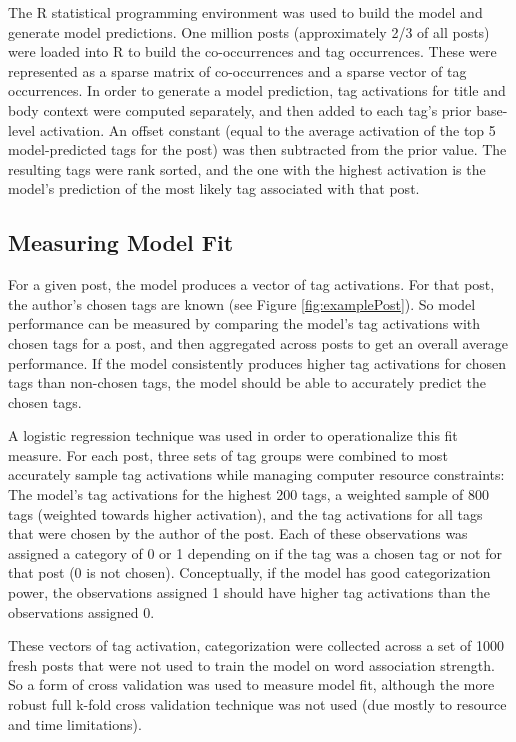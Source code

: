 \documentclass[10pt,letterpaper]{article}
\begin{document}
The R statistical programming environment was used to build the model and generate model predictions.
One million posts (approximately 2/3 of all posts) were loaded into R to build the co-occurrences and tag occurrences.
These were represented as a sparse matrix of co-occurrences and a sparse vector of tag occurrences.
In order to generate a model prediction, tag activations for title and body context were computed separately, and then added to each tag's prior base-level activation.
An offset constant (equal to the average activation of the top 5 model-predicted tags for the post) was then subtracted from the prior value.
The resulting tags were rank sorted, and the one with the highest activation is the model's prediction of the most likely tag associated with that post.

\subsection{Measuring Model Fit}

For a given post, the model produces a vector of tag activations.
For that post, the author's chosen tags are known (see Figure \ref{fig:examplePost}).
So model performance can be measured by comparing the model's tag activations with chosen tags for a post, and then aggregated across posts to get an overall average performance.
If the model consistently produces higher tag activations for chosen tags than non-chosen tags, the model should be able to accurately predict the chosen tags.

A logistic regression technique was used in order to operationalize this fit measure.
For each post, three sets of tag groups were combined to most accurately sample tag activations while managing computer resource constraints:
The model's tag activations for the highest 200 tags, a weighted sample of 800 tags (weighted towards higher activation), and the tag activations for all tags that were chosen by the author of the post.
Each of these observations was assigned a category of 0 or 1 depending on if the tag was a chosen tag or not for that post (0 is not chosen).
Conceptually, if the model has good categorization power, the observations assigned 1 should have higher tag activations than the observations assigned 0.

These vectors of tag activation, categorization were collected across a set of \num{1000} fresh posts that were not used to train the model on word association strength.
So a form of cross validation was used to measure model fit, although the more robust full k-fold cross validation technique was not used (due mostly to resource and time limitations).
\end{document}
